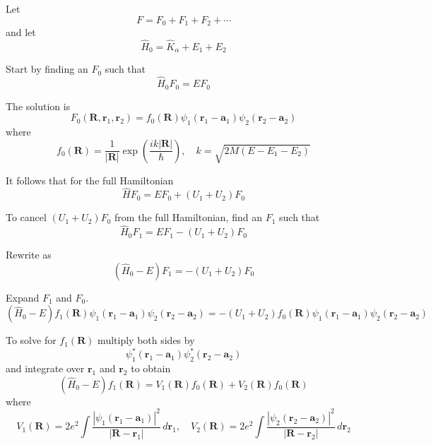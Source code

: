 \documentclass[12pt]{article}
\begin{document}
Let
\begin{equation*}
F=F_0+F_1+F_2+\cdots
\end{equation*}
and let
\begin{equation*}
\hat H_0=\hat K_\alpha+E_1+E_2
\end{equation*}

Start by finding an $F_0$ such that
\begin{equation*}
\hat H_0F_0=EF_0
\end{equation*}

The solution is
\begin{equation*}
F_0(\mathbf R,\mathbf r_1,\mathbf r_2)=f_0(\mathbf R)\psi_1(\mathbf r_1-\mathbf a_1)\psi_2(\mathbf r_2-\mathbf a_2)
\tag{1}
\end{equation*}
where
\begin{equation*}
f_0(\mathbf R)=\frac{1}{|\mathbf R|}\exp\left(\frac{ik|\mathbf R|}{\hbar}\right),\quad k=\sqrt{2M(E-E_1-E_2)}
\end{equation*}

It follows that for the full Hamiltonian
\begin{equation*}
\hat HF_0=EF_0+(U_1+U_2)F_0
\end{equation*}

To cancel $(U_1+U_2)F_0$ from the full Hamiltonian, find an $F_1$ such that
\begin{equation*}
\hat H_0F_1=EF_1-(U_1+U_2)F_0
\end{equation*}

Rewrite as
\begin{equation*}
\left(\hat H_0-E\right)F_1=-(U_1+U_2)F_0
\end{equation*}

Expand $F_1$ and $F_0$.
\begin{equation*}
\left(\hat H_0-E\right)f_1(\mathbf R)\psi_1(\mathbf r_1-\mathbf a_1)\psi_2(\mathbf r_2-\mathbf a_2)
=-(U_1+U_2)f_0(\mathbf R)\psi_1(\mathbf r_1-\mathbf a_1)\psi_2(\mathbf r_2-\mathbf a_2)
\end{equation*}

To solve for $f_1(\mathbf R)$ multiply both sides by
\begin{equation*}
\psi_1^*(\mathbf r_1-\mathbf a_1)\psi_2^*(\mathbf r_2-\mathbf a_2)
\end{equation*}
and integrate over $\mathbf r_1$ and $\mathbf r_2$ to obtain
\begin{equation*}
\left(\hat H_0-E\right)f_1(\mathbf R)
=V_1(\mathbf R)f_0(\mathbf R)+V_2(\mathbf R)f_0(\mathbf R)
\tag{2}
\end{equation*}
where
\begin{equation*}
V_1(\mathbf R)
=2e^2\int\frac{|\psi_1(\mathbf r_1-\mathbf a_1)|^2}{|\mathbf R-\mathbf r_1|}\,d\mathbf r_1,
\quad
V_2(\mathbf R)=
2e^2\int\frac{|\psi_2(\mathbf r_2-\mathbf a_2)|^2}{|\mathbf R-\mathbf r_2|}\,d\mathbf r_2
\end{equation*}
\end{document}
